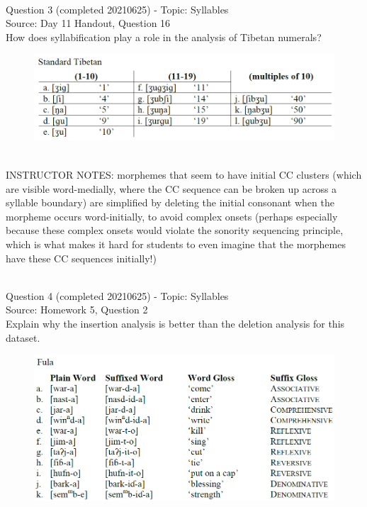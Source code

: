 \documentclass[12pt]{article}
\begin{document}
~\\

{\large Question 3} (completed 20210625) - Topic: Syllables\\
Source: Day 11 Handout, Question 16\\

How does syllabification play a role in the analysis of Tibetan numerals?\\

\begin{figure}[H]
\includegraphics{../images/tibetan.png}
\end{figure}

~\\
INSTRUCTOR NOTES: morphemes that seem to have initial CC clusters (which are visible word-medially, where the CC sequence can be broken up across a syllable boundary) are simplified by deleting the initial consonant when the morpheme occurs word-initially, to avoid complex onsets (perhaps especially because these complex onsets would violate the sonority sequencing principle, which is what makes it hard for students to even imagine that the morphemes have these CC sequences initially!)


~\\

{\large Question 4} (completed 20210625) - Topic: Syllables\\
Source: Homework 5, Question 2\\

Explain why the insertion analysis is better than the deletion analysis for this dataset.\\

\begin{figure}[H]
\includegraphics{../images/fula.png}
\end{figure}
\end{document}
